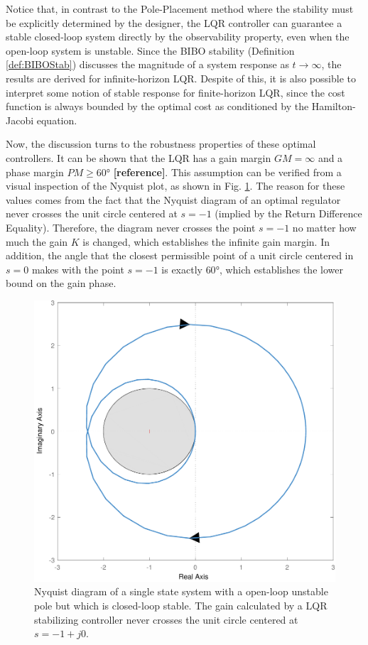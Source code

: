 \documentclass[a4paper,11pt]{book}
\numberwithin{figure}{chapter}
\numberwithin{equation}{chapter}
\numberwithin{table}{chapter}
\theoremstyle{definition}
\begin{document}
Notice that, in contrast to the Pole-Placement method where the stability must be explicitly determined by the designer, the LQR controller can guarantee a stable closed-loop system directly by the observability property, even when the open-loop system is unstable. Since the BIBO stability (Definition \ref{def:BIBOStab}) discusses the magnitude of a system response as $t \to \infty$, the results are derived for infinite-horizon LQR. Despite of this, it is also possible to interpret some notion of stable response for finite-horizon LQR, since the cost function is always bounded by the optimal cost as conditioned by the Hamilton-Jacobi equation.

Now, the discussion turns to the robustness properties of these optimal controllers. It can be shown that the LQR has a gain margin $GM = \infty$ and a phase margin $PM \geq \ang{60}$ \textbf{[reference]}. This assumption can be verified from a visual inspection of the Nyquist plot, as shown in Fig. \ref{fig:lqrProperties01}. The reason for these values comes from the fact that the Nyquist diagram of an optimal regulator never crosses the unit circle centered at $s = -1$ (implied by the Return Difference Equality). Therefore, the diagram never crosses the point $s = -1$ no matter how much the gain $K$ is changed, which establishes the infinite gain margin. In addition, the angle that the closest permissible point of a unit circle centered in $s = 0$ makes with the point $s = -1$ is exactly $\ang{60}$, which establishes the lower bound on the gain phase.

\begin{figure}[ht]
	\centering
	\includegraphics[scale=0.65]{chapter4/report_ch4_2}
	\caption{Nyquist diagram of a single state system with a open-loop unstable pole but which is closed-loop stable. The gain calculated by a LQR stabilizing controller never crosses the unit circle centered at $s = -1 + j0$.}
	\label{fig:lqrProperties01}
\end{figure}
\end{document}
